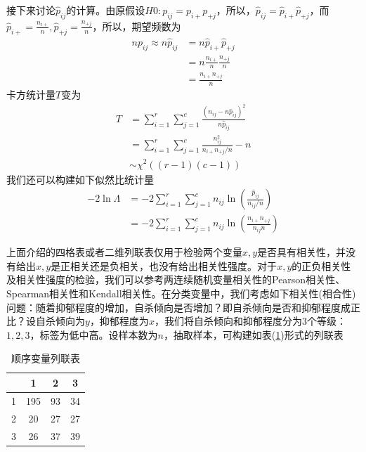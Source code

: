             \par
            接下来讨论$\hat{p}_{ij}$的计算。由原假设$H0:p_{ij} = p_{i+}p_{+j}$，所以，$\hat{p}_{ij} = \hat{p}_{i+}\hat{p}_{+j}$，而$\hat{p}_{i+} = \frac{n_{i+}}{n},\hat{p}_{+j} = \frac{n_{+j}}{n}$，所以，期望频数为
            \begin{align*}
            np_{ij} \approx n\hat{p}_{ij} &= n\hat{p}_{i+}\hat{p}_{+j} \\
            &= n\frac{n_{i+}}{n}\frac{n_{+j}}{n} \\
            &=\frac{n_{i+}n_{+j}}{n}
            \end{align*}
            卡方统计量$T$变为
            \begin{align*}
            T &= \sum_{i=1}^r\sum_{j=1}^c \frac{(n_{ij} - n\hat{p}_{ij})^2}{n\hat{p}_{ij}}\\
            &=\sum_{i=1}^r\sum_{j=1}^c \frac{n_{ij}^2}{n_{i+}n_{+j}/n} -n \\
            &\sim \chi^2((r-1)(c-1))
            \end{align*}
            我们还可以构建如下似然比统计量
            \begin{align*}
            -2\ln \varLambda & = -2\sum_{i=1}^r\sum_{j=1}^cn_{ij}\ln \left( \frac{\hat{p}_{ij}}{n_{ij}/n} \right)  \\
            &=-2\sum_{i=1}^r\sum_{j=1}^cn_{ij}\ln \left( \frac{n_{i+}n_{+j}}{n_{ij}n} \right)
            \end{align*}
            \par
            上面介绍的四格表或者二维列联表仅用于检验两个变量$x,y$是否具有相关性，并没有给出$x,y$是正相关还是负相关，也没有给出相关性强度。对于$x,y$的正负相关性及相关性强度的检验，我们可以参考两连续随机变量相关性的Pearson相关性、Spearman相关性和Kendall相关性。在分类变量中，我们考虑如下相关性(相合性)问题：随着抑郁程度的增加，自杀倾向是否增加？即自杀倾向是否和抑郁程度成正比？设自杀倾向为$y$，抑郁程度为$x$，我们将自杀倾向和抑郁程度分为3个等级：$1,2,3$，标签为低中高。设样本数为$n$，抽取样本，可构建如表(\ref{tab:顺序变量列联表})形式的列联表
            \begin{table}[H]
            \caption{顺序变量列联表}
            \label{tab:顺序变量列联表}
            \centering
            \begin {tabular}{c|ccc}
            {} & 1 & 2 & 3 \\\hline
            1 & 195 & 93 & 34 \\
            2 & 20 & 27 & 27 \\
            3 & 26 & 37 & 39 \\
            \end{tabular}
            \end{table}
